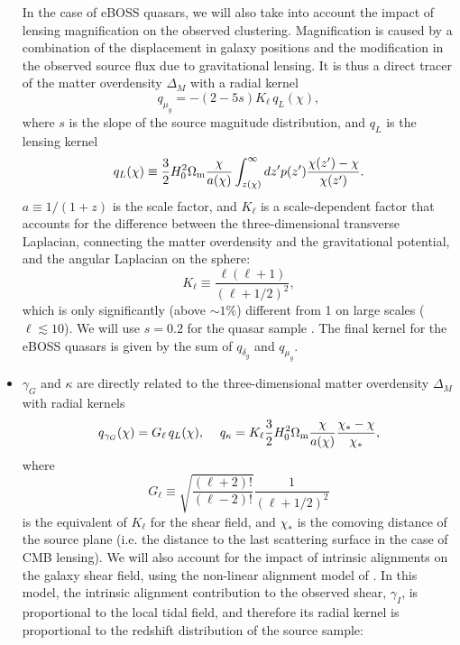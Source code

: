 \documentclass[a4paper,11pt]{article}
\newcommand{\Om}{\Omega_{\rm m}}
\begin{document}
\begin{itemize}
        In the case of eBOSS quasars, we will also take into account the impact of lensing magnification on the observed clustering. Magnification is caused by a combination of the displacement in galaxy positions and the modification in the observed source flux due to gravitational lensing. It is thus a direct tracer of the matter overdensity $\Delta_M$ with a radial kernel
        \begin{equation}
           q_{\mu_g}=-(2-5s)K_\ell\,q_L(\chi),
        \end{equation}
        where $s$ is the slope of the source magnitude distribution, and $q_L$ is the lensing kernel
        \begin{equation}
          q_L(\chi)\equiv\frac{3}{2}H_0^2\Om\frac{\chi}{a(\chi)}\int_{z(\chi)}^\infty dz' p(z')\frac{\chi(z')-\chi}{\chi(z')}.
        \end{equation}
        $a\equiv1/(1+z)$ is the scale factor, and $K_\ell$ is a scale-dependent factor that accounts for the difference between the three-dimensional transverse Laplacian, connecting the matter overdensity and the gravitational potential, and the angular Laplacian on the sphere:
        \begin{equation}
          K_\ell\equiv\frac{\ell(\ell+1)}{(\ell+1/2)^2},
        \end{equation}
        which is only significantly (above $\sim1\%$) different from 1 on large scales ($\ell\lesssim10$). We will use $s=0.2$ for the quasar sample \cite{astro-ph/0504510}. The final kernel for the eBOSS quasars is given by the sum of $q_{\delta_g}$ and $q_{\mu_g}$.
        \item $\gamma_G$ and $\kappa$ are directly related to the three-dimensional matter overdensity $\Delta_M$ with radial kernels
        \begin{equation}
           q_{\gamma_G}(\chi)=G_\ell\,q_L(\chi),\hspace{12pt}
           q_{\kappa}=K_\ell\frac{3}{2}H_0^2\Om\frac{\chi}{a(\chi)}\frac{\chi_*-\chi}{\chi_*},
        \end{equation}
        where
        \begin{equation}
          G_\ell\equiv\sqrt{\frac{(\ell+2)!}{(\ell-2)!}}\frac{1}{(\ell+1/2)^2}
        \end{equation}
        is the equivalent of $K_\ell$ for the shear field, and $\chi_*$ is the comoving distance of the source plane (i.e. the distance to the last scattering surface in the case of CMB lensing). We will also account for the impact of intrinsic alignments on the galaxy shear field, using the non-linear alignment model of \cite{astro-ph/0406275,0705.0166}. In this model, the intrinsic alignment contribution to the observed shear, $\gamma_I$, is proportional to the local tidal field, and therefore its radial kernel is proportional to the redshift distribution of the source sample:

\end{itemize}
\end{document}
